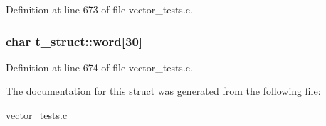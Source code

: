 \-Definition at line 673 of file vector\-\_\-tests.\-c.

\hypertarget{structt__struct_ab5b290b572fc4036f1e5efc671098c7f}{
\subsubsection[{word}]{\setlength{\rightskip}{0pt plus 5cm}char {\bf t\-\_\-struct\-::word}\mbox{[}30\mbox{]}}}\label{structt__struct_ab5b290b572fc4036f1e5efc671098c7f}


\-Definition at line 674 of file vector\-\_\-tests.\-c.



\-The documentation for this struct was generated from the following file\-:\begin{DoxyCompactItemize}
\item 
\hyperlink{vector__tests_8c}{vector\-\_\-tests.\-c}\end{DoxyCompactItemize}
